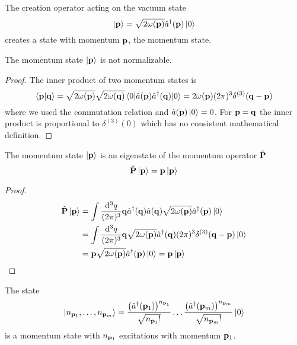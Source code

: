 \begin{definition}
	The creation operator acting on the vacuum state
	\begin{equation}
		\ket{\vb{p}}
		=
		\sqrt{2\omega(\vb{p})}
		\hat{a}^\dagger(\vb{p})
		\ket{0}
	\end{equation}
	creates a state with momentum $\vb{p}$, the momentum state.
\end{definition}
\begin{theorem}
	The momentum state $\ket{\vb{p}}$ is not normalizable.
\end{theorem}
\begin{proof}
	The inner product of two momentum states is
	\begin{equation}
		\braket{\vb{p}}{\vb{q}}
		=
		\sqrt{2\omega(\vb{p})}
		\sqrt{2\omega(\vb{q})}
		\expval{\hat{a}(\vb{p})\hat{a}^\dagger(\vb{q})}{0}
		=
		2\omega(\vb{p})
		(2\pi)^3
		\delta^{(3)}(\vb{q}-\vb{p})
	\end{equation}
	where we used the commutation relation and $\hat{a}(\vb{p})\ket{0}=0$.
	For $\vb{p}=\vb{q}$ the inner product is proportional to $\delta^{(3)}(0)$ which has no consistent mathematical definition.
\end{proof}
\begin{theorem}
	The momentum state $\ket{\vb{p}}$ is an eigenstate of the momentum operator $\hat{\vb{P}}$
	\begin{equation}
		\hat{\vb{P}}
		\ket{\vb{p}}
		=
		\vb{p}
		\ket{\vb{p}}
	\end{equation}
\end{theorem}
\begin{proof}
	\begin{equation*}
		\begin{split}
			\hat{\vb{P}}
			\ket{\vb{p}}
			&=
			\int\frac{\dd[3]{q}}{(2\pi)^3}
			\vb{q}
			\hat{a}^\dagger(\vb{q})
			\hat{a}(\vb{q})
			\sqrt{2\omega(\vb{p})}
			\hat{a}^\dagger(\vb{p})
			\ket{0}
			\\
			&=
			\int\frac{\dd[3]{q}}{(2\pi)^3}
			\vb{q}
			\sqrt{2\omega(\vb{p})}
			\hat{a}^\dagger(\vb{q})
			(2\pi)^3
			\delta^{(3)}(\vb{q}-\vb{p})
			\ket{0}
			\\
			&=
			\vb{p}
			\sqrt{2\omega(\vb{p})}
			\hat{a}^\dagger(\vb{p})
			\ket{0}
			=
			\vb{p}
			\ket{\vb{p}}
		\end{split}
	\end{equation*}
\end{proof}
\begin{definition}
	The state
	\begin{equation}
		\ket{n_{\vb{p}_1},\dots,n_{\vb{p}_m}}
		=
		\frac{\left(\hat{a}^\dagger(\vb{p}_1)\right)^{n_{\vb{p}_1}}}{\sqrt{n_{\vb{p}_1}!}}
		\dots
		\frac{\left(\hat{a}^\dagger(\vb{p}_m)\right)^{n_{\vb{p}_m}}}{\sqrt{n_{\vb{p}_m}!}}
		\ket{0}
	\end{equation}
	is a momentum state with $n_{\vb{p}_1}$ excitations with momentum $\vb{p}_1$.
\end{definition}
